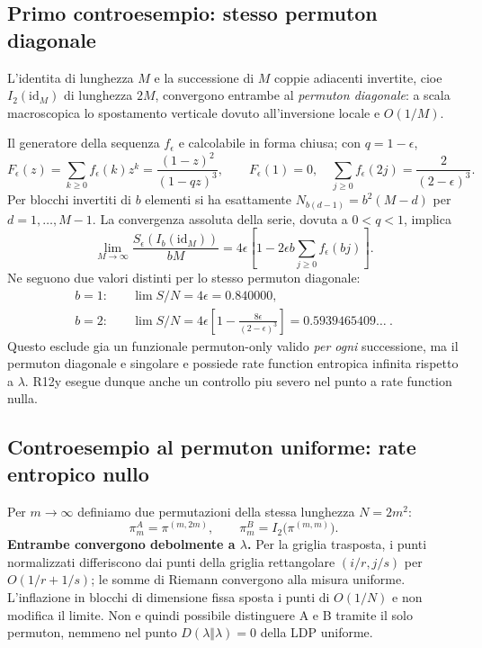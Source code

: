 \documentclass[11pt,a4paper]{article}
\begin{document}
\subsection{Primo controesempio: stesso permuton diagonale}

L'identita di lunghezza $M$ e la successione di $M$ coppie adiacenti invertite, cioe $I_2(\mathrm{id}_M)$ di lunghezza $2M$, convergono entrambe al \emph{permuton diagonale}: a scala macroscopica lo spostamento verticale dovuto all'inversione locale e $O(1/M)$.

Il generatore della sequenza $f_\epsilon$ e calcolabile in forma chiusa; con $q=1-\epsilon$,
\begin{equation}
 F_\epsilon(z)=\sum_{k\ge0}f_\epsilon(k)z^k
 =\frac{(1-z)^2}{(1-qz)^3},\qquad
 F_\epsilon(1)=0,\quad
 \sum_{j\ge0}f_\epsilon(2j)=\frac{2}{(2-\epsilon)^3}.\label{eq:r12y_generating}
\end{equation}
Per blocchi invertiti di $b$ elementi si ha esattamente $N_{b(d-1)}=b^2(M-d)$ per $d=1,\ldots,M-1$. La convergenza assoluta della serie, dovuta a $0<q<1$, implica
\begin{equation}
 \lim_{M\to\infty}\frac{S_\epsilon(I_b(\mathrm{id}_M))}{bM}
 =4\epsilon\left[1-2\epsilon b\sum_{j\ge0}f_\epsilon(bj)\right].\label{eq:r12y_diag_general}
\end{equation}
Ne seguono due valori distinti per lo stesso permuton diagonale:
\begin{align}
 b=1:\quad &\lim S/N=4\epsilon=0.840000,\\
 b=2:\quad &\lim S/N=4\epsilon\left[1-\frac{8\epsilon}{(2-\epsilon)^3}\right]
 =0.5939465409\ldots\ .\label{eq:r12y_diag_values}
\end{align}
Questo esclude gia un funzionale permuton-only valido \emph{per ogni} successione, ma il permuton diagonale e singolare e possiede rate function entropica infinita rispetto a $\lambda$. R12y esegue dunque anche un controllo piu severo nel punto a rate function nulla.

\subsection{Controesempio al permuton uniforme: rate entropico nullo}

Per $m\to\infty$ definiamo due permutazioni della stessa lunghezza $N=2m^2$:
\begin{equation}
 \pi_m^A=\pi^{(m,2m)},\qquad
 \pi_m^B=I_2\bigl(\pi^{(m,m)}\bigr).\label{eq:r12y_uniform_pair}
\end{equation}
\textbf{Entrambe convergono debolmente a $\lambda$.} Per la griglia trasposta, i punti normalizzati differiscono dai punti della griglia rettangolare $(i/r,j/s)$ per $O(1/r+1/s)$; le somme di Riemann convergono alla misura uniforme. L'inflazione in blocchi di dimensione fissa sposta i punti di $O(1/N)$ e non modifica il limite. Non e quindi possibile distinguere A e B tramite il solo permuton, nemmeno nel punto $D(\lambda\Vert\lambda)=0$ della LDP uniforme.
\end{document}
